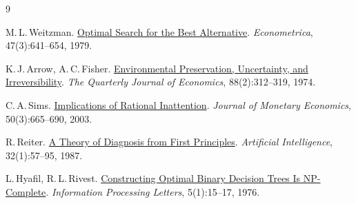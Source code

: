 \documentclass[11pt,a4paper]{article}
\theoremstyle{preprintthm}
\theoremstyle{preprintdef}
\begin{document}
\begin{thebibliography}{9}
\small\setlength{\itemsep}{1pt}

M.\,L.\,Weitzman. \href{https://scholar.harvard.edu/files/weitzman/files/optimalsearchbestalternative.pdf}{Optimal Search for the Best Alternative}. \emph{Econometrica}, 47(3):641--654, 1979.

K.\,J.\,Arrow, A.\,C.\,Fisher. \href{https://doi.org/10.2307/1883074}{Environmental Preservation, Uncertainty, and Irreversibility}. \emph{The Quarterly Journal of Economics}, 88(2):312--319, 1974.

C.\,A.\,Sims. \href{https://doi.org/10.1016/S0304-3932(03)00029-1}{Implications of Rational Inattention}. \emph{Journal of Monetary Economics}, 50(3):665--690, 2003.

R.\,Reiter. \href{https://doi.org/10.1016/0004-3702(87)90062-2}{A Theory of Diagnosis from First Principles}. \emph{Artificial Intelligence}, 32(1):57--95, 1987.

L.\,Hyafil, R.\,L.\,Rivest. \href{https://www.sciencedirect.com/science/article/abs/pii/0020019076900958}{Constructing Optimal Binary Decision Trees Is NP-Complete}. \emph{Information Processing Letters}, 5(1):15--17, 1976.

\end{thebibliography}
\end{document}
